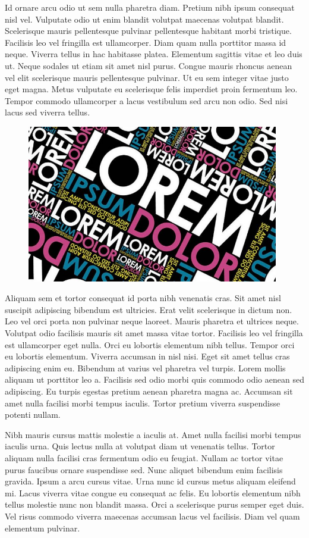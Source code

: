 \documentclass[]{article}
\begin{document}
Id ornare arcu odio ut sem nulla pharetra diam. Pretium nibh ipsum consequat nisl vel. Vulputate odio ut enim blandit volutpat maecenas volutpat blandit. Scelerisque mauris pellentesque pulvinar pellentesque habitant morbi tristique. Facilisis leo vel fringilla est ullamcorper. Diam quam nulla porttitor massa id neque. Viverra tellus in hac habitasse platea. Elementum sagittis vitae et leo duis ut. Neque sodales ut etiam sit amet nisl purus. Congue mauris rhoncus aenean vel elit scelerisque mauris pellentesque pulvinar. Ut eu sem integer vitae justo eget magna. Metus vulputate eu scelerisque felis imperdiet proin fermentum leo. Tempor commodo ullamcorper a lacus vestibulum sed arcu non odio. Sed nisi lacus sed viverra tellus.
\begin{figure}[ht]
\includegraphics[width=0.98\textwidth]{Lorem}
\end{figure}

Aliquam sem et tortor consequat id porta nibh venenatis cras. Sit amet nisl suscipit adipiscing bibendum est ultricies. Erat velit scelerisque in dictum non. Leo vel orci porta non pulvinar neque laoreet. Mauris pharetra et ultrices neque. Volutpat odio facilisis mauris sit amet massa vitae tortor. Facilisis leo vel fringilla est ullamcorper eget nulla. Orci eu lobortis elementum nibh tellus. Tempor orci eu lobortis elementum. Viverra accumsan in nisl nisi. Eget sit amet tellus cras adipiscing enim eu. Bibendum at varius vel pharetra vel turpis. Lorem mollis aliquam ut porttitor leo a. Facilisis sed odio morbi quis commodo odio aenean sed adipiscing. Eu turpis egestas pretium aenean pharetra magna ac. Accumsan sit amet nulla facilisi morbi tempus iaculis. Tortor pretium viverra suspendisse potenti nullam.

Nibh mauris cursus mattis molestie a iaculis at. Amet nulla facilisi morbi tempus iaculis urna. Quis lectus nulla at volutpat diam ut venenatis tellus. Tortor aliquam nulla facilisi cras fermentum odio eu feugiat. Nullam ac tortor vitae purus faucibus ornare suspendisse sed. Nunc aliquet bibendum enim facilisis gravida. Ipsum a arcu cursus vitae. Urna nunc id cursus metus aliquam eleifend mi. Lacus viverra vitae congue eu consequat ac felis. Eu lobortis elementum nibh tellus molestie nunc non blandit massa. Orci a scelerisque purus semper eget duis. Vel risus commodo viverra maecenas accumsan lacus vel facilisis. Diam vel quam elementum pulvinar.
\end{document}
